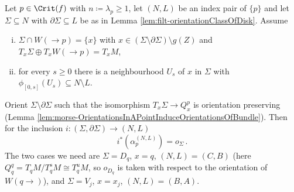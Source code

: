 \begin{lemma}\label{lem:filt-generatorsOnDisks}
	Let $p\in\Crit(f)$ with $n\coloneq\lambda_p\geq 1$, let $(N,L)$ be an index pair of $\{p\}$ and let $\Sigma\subseteq N$ with $\partial\Sigma\subseteq L$ be as in Lemma \ref{lem:filt-orientationClassOfDisk}. Assume
	\begin{enumerate}[(i)]
		\item $\Sigma\cap W(\to p)=\{x\}$ with $x\in(\Sigma\setminus\partial\Sigma)\setminus g(Z)$ and $T_x\Sigma\oplus T_xW(\to p)=T_xM$,
		\item for every $s\geq 0$ there is a neighbourhood $U_s$ of $x$ in $\Sigma$ with $\phi_{[0,s]}(U_s)\subseteq N\setminus L$.
	\end{enumerate}
	Orient $\Sigma\setminus\partial\Sigma$ such that the isomorphism $T_x\Sigma\to Q^p_x$ is orientation preserving (Lemma \ref{lem:morse-OrientationsInAPointInduceOrientationsOfBundle}). Then for the inclusion $i:(\Sigma,\partial\Sigma)\to(N,L)$
	\begin{equation*}
		i^*\left(\alpha_p^{(N,L)}\right)=o_\Sigma\,.
	\end{equation*}
	The two cases we need are $\Sigma=D_q$, $x=q$, $(N,L)=(C,B)$ (here $Q^q_q=T_qM/T^s_qM\cong T^u_qM$, so $o_{D_q}$ is taken with respect to the orientation of $W(q\to)$), and $\Sigma=V_j$, $x=x_j$, $(N,L)=(B,A)$.
\end{lemma}
